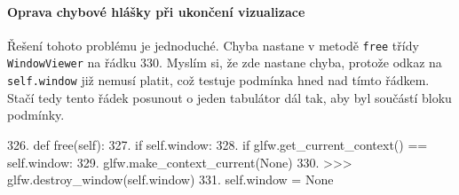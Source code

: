 \paragraph{Oprava chybové hlášky při ukončení vizualizace}
Řešení tohoto problému je jednoduché. Chyba nastane v metodě \texttt{free}
třídy \texttt{WindowViewer} na řádku 330. Myslím si, že zde nastane chyba,
protože odkaz na \texttt{self.window} již nemusí platit, což testuje podmínka
hned nad tímto řádkem. Stačí tedy tento řádek posunout o jeden tabulátor dál
tak, aby byl součástí bloku podmínky.

\begin{code}
326.  def free(self):
327.      if self.window:
328.          if glfw.get_current_context() == self.window:
329.              glfw.make_context_current(None)
330.      >>> glfw.destroy_window(self.window)
331.      self.window = None
\end{code}


